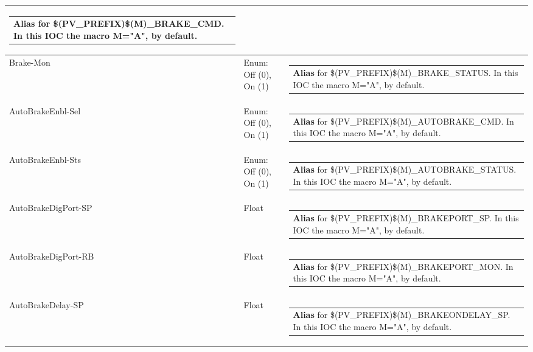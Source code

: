 \documentclass[openany]{article}
\begin{document}
\begin{longtable}{| m{4.5cm} m{2.5cm}  m{8.5cm} |}
\begin{tabular}{@{}m{6cm}@{}}
                \textbf{\color{blue} Alias} for \$(PV\_PREFIX)\$(M)\_BRAKE\_CMD. In this IOC the macro M="A", by default.
            \end{tabular} \hypertarget{pv:brake-mon}{}\\ \hline
        Brake-Mon & Enum: Off (0), On (1) & \begin{tabular}{@{}m{6cm}@{}}
                \textbf{\color{blue} Alias} for \$(PV\_PREFIX)\$(M)\_BRAKE\_STATUS. In this IOC the macro M="A", by default.
            \end{tabular} \hypertarget{pv:auto-brake-enbl}{}\\ \hline
        AutoBrakeEnbl-Sel & Enum: Off (0), On (1) & \begin{tabular}{@{}m{6cm}@{}}
                \textbf{\color{blue} Alias} for \$(PV\_PREFIX)\$(M)\_AUTOBRAKE\_CMD. In this IOC the macro M="A", by default.
            \end{tabular} \hypertarget{}{}\\ \hline
        AutoBrakeEnbl-Sts & Enum: Off (0), On (1) & \begin{tabular}{@{}m{6cm}@{}}
                \textbf{\color{blue} Alias} for \$(PV\_PREFIX)\$(M)\_AUTOBRAKE\_STATUS. In this IOC the macro M="A", by default.
            \end{tabular} \hypertarget{pv:auto-brake-dig-port}{}\\ \hline
        AutoBrakeDigPort-SP & Float & \begin{tabular}{@{}m{6cm}@{}}
                \textbf{\color{blue} Alias} for \$(PV\_PREFIX)\$(M)\_BRAKEPORT\_SP. In this IOC the macro M="A", by default.
            \end{tabular} \hypertarget{}{}\\ \hline
        AutoBrakeDigPort-RB & Float & \begin{tabular}{@{}m{6cm}@{}}
                \textbf{\color{blue} Alias} for \$(PV\_PREFIX)\$(M)\_BRAKEPORT\_MON. In this IOC the macro M="A", by default.
            \end{tabular} \hypertarget{pv:auto-brake-delay}{}\\ \hline
        AutoBrakeDelay-SP & Float & \begin{tabular}{@{}m{6cm}@{}}
                \textbf{\color{blue} Alias} for \$(PV\_PREFIX)\$(M)\_BRAKEONDELAY\_SP. In this IOC the macro M="A", by default.
            \end{tabular} \hypertarget{}{}\\ \hline

\end{longtable}
\end{document}

